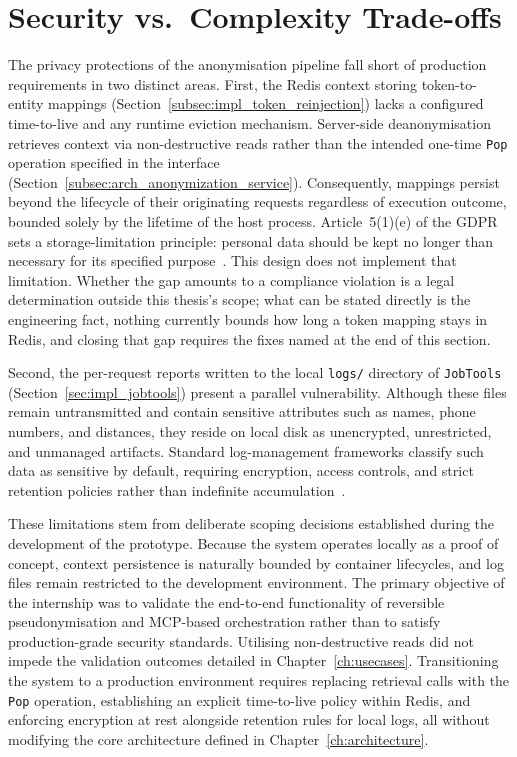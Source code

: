\section{Security vs.\ Complexity Trade-offs}
\label{sec:discussion_security_complexity}

The privacy protections of the anonymisation pipeline fall short of production requirements in two distinct areas. First, the Redis context storing token-to-entity mappings (Section~\ref{subsec:impl_token_reinjection}) lacks a configured time-to-live and any runtime eviction mechanism. Server-side deanonymisation retrieves context via non-destructive reads rather than the intended one-time \texttt{Pop} operation specified in the interface (Section~\ref{subsec:arch_anonymization_service}). Consequently, mappings persist beyond the lifecycle of their originating requests regardless of execution outcome, bounded solely by the lifetime of the host process. Article~5(1)(e) of the GDPR sets a storage-limitation principle: personal data should be kept no longer than necessary for its specified purpose~\cite{gdpr2016}. This design does not implement that limitation. Whether the gap amounts to a compliance violation is a legal determination outside this thesis's scope; what can be stated directly is the engineering fact, nothing currently bounds how long a token mapping stays in Redis, and closing that gap requires the fixes named at the end of this section.

Second, the per-request reports written to the local \texttt{logs/} directory of \texttt{JobTools} (Section~\ref{sec:impl_jobtools}) present a parallel vulnerability. Although these files remain untransmitted and contain sensitive attributes such as names, phone numbers, and distances, they reside on local disk as unencrypted, unrestricted, and unmanaged artifacts. Standard log-management frameworks classify such data as sensitive by default, requiring encryption, access controls, and strict retention policies rather than indefinite accumulation~\cite{nist2006logmanagement}.

These limitations stem from deliberate scoping decisions established during the development of the prototype. Because the system operates locally as a proof of concept, context persistence is naturally bounded by container lifecycles, and log files remain restricted to the development environment. The primary objective of the internship was to validate the end-to-end functionality of reversible pseudonymisation and MCP-based orchestration rather than to satisfy production-grade security standards. Utilising non-destructive reads did not impede the validation outcomes detailed in Chapter~\ref{ch:usecases}. Transitioning the system to a production environment requires replacing retrieval calls with the \texttt{Pop} operation, establishing an explicit time-to-live policy within Redis, and enforcing encryption at rest alongside retention rules for local logs, all without modifying the core architecture defined in Chapter~\ref{ch:architecture}.

